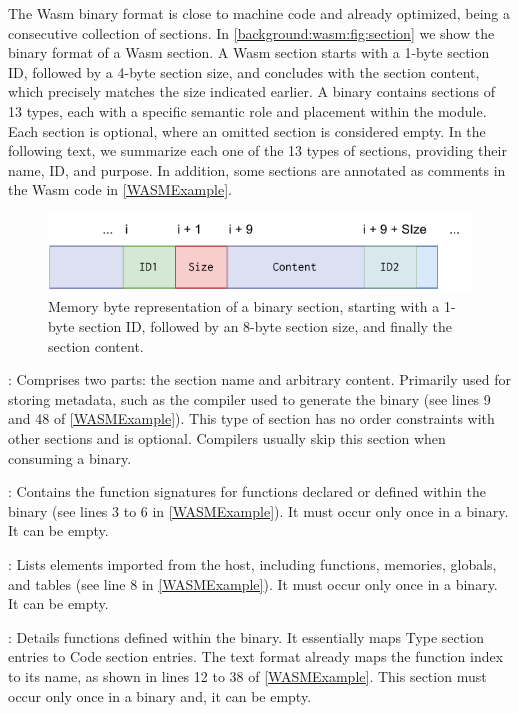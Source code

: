 The Wasm binary format is close to machine code and already optimized, being a consecutive collection of sections.
In \autoref{background:wasm:fig:section} we show the binary format of a Wasm section.
A Wasm section starts with a 1-byte section ID, followed by a 4-byte section size, and concludes with the section content, which precisely matches the size indicated earlier.
A \wasm binary contains sections of 13 types, each with a specific semantic role and placement within the module. 
Each section is optional, where an omitted section is considered empty.
In the following text, we summarize each one of the 13 types of \wasm sections, providing their name, ID, and purpose. 
In addition, some sections are annotated as comments in the Wasm code in \autoref{WASMExample}.
    
\begin{figure}[h]
    \centering
    \includegraphics[width=0.5\linewidth]{figures/section.pdf}
    \caption{Memory byte representation of a \Wasm binary section, starting with a 1-byte section ID, followed by an 8-byte section size, and finally the section content.}
    \label{background:wasm:fig:section}
\end{figure}

: Comprises two parts: the section name and arbitrary content. Primarily used for storing metadata, such as the compiler used to generate the binary (see lines 9 and 48 of \autoref{WASMExample}). This type of section has no order constraints with other sections and is optional. Compilers usually skip this section when consuming a \Wasm binary. 

: Contains the function signatures for functions declared or defined within the binary (see lines 3 to 6 in \autoref{WASMExample}). It must occur only once in a binary. It can be empty.

: Lists elements imported from the host, including functions, memories, globals, and tables (see line 8 in \autoref{WASMExample}). It must occur only once in a binary. It can be empty.

: Details functions defined within the binary. It essentially maps Type section entries to Code section entries. The text format already maps the function index to its name, as shown in lines 12 to 38 of \autoref{WASMExample}. This section must occur only once in a binary and, it can be empty. 

